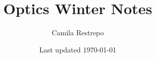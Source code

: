 \documentclass{notes}
\title{\bfseries Optics Winter Notes}
\author{Camila Restrepo}
\date{Last updated \today}
\begin{document}
\maketitle
\toccontents
\frontpagewarning



\end{document}
